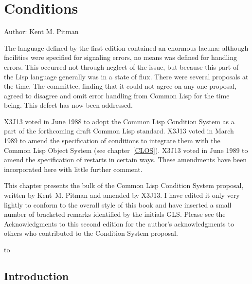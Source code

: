 
\clearpage\def\pagestatus{FINAL PROOF}


\def\SU#1{${}_{#1}$}

\chapter{Conditions}
\label{CONDITION}

Author: Kent M. Pitman
\prefaceword
\begin{new}
The language defined by the first edition contained an enormous lacuna:
although facilities were specified for signaling errors,
no means was defined for handling errors.  This occurred not through neglect
of the issue, but because this part of the Lisp language generally
was in a state of flux.  There were several proposals at the
time.  The committee, finding that it could not agree on any one proposal,
agreed to disagree and omit error handling from Common Lisp for the time being.
This defect has now been addressed.
\end{new}

X3J13 voted in June 1988
to adopt the Common Lisp Condition System
as a part of the forthcoming draft Common Lisp standard.
X3J13 voted in March 1989 
to amend the specification of conditions to integrate them
with the Common Lisp Object System (see chapter~\ref{CLOS}). 
X3J13 voted in June 1989  to amend the
specification of restarts in certain ways. These amendments have
been incorporated here with little further comment.

This chapter presents the bulk of the Common Lisp
Condition System proposal, written by Kent~M. Pitman
and amended by X3J13.  I have edited it only very lightly
to conform to the overall style of this book and have inserted a small
number of bracketed remarks identified by the initials GLS.
Please see the Acknowledgments to this second edition for the author's
acknowledgments to others who contributed to the Condition System proposal.

\noindent\hbox to \textwidth{\hss---Guy L. Steele Jr.}



\section{Introduction}

